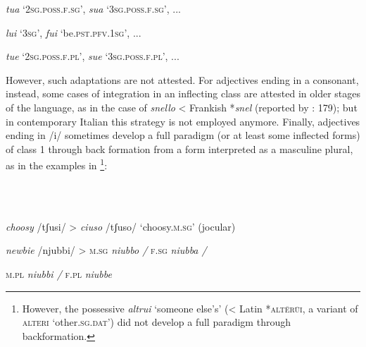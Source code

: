 \documentclass[output=paper]{langscibook}
\begin{document}
\textit{tua} ‘\textsc{2sg.poss.f.sg’}, \textit{sua} \textsc{‘3sg.poss.f.sg’,} ...

\textit{lui} \textsc{‘3sg’,} \textit{fui} \textsc{‘}be\textsc{.pst.pfv.1sg’,} ...

\textit{tue} ‘\textsc{2sg.poss.f.pl’}, \textit{sue} \textsc{‘3sg.poss.f.pl’,} ...

However, such adaptations are not attested. For adjectives ending in a consonant, instead, some cases of integration in an inflecting class are attested in older stages of the language, as in the case of \textit{snello} < Frankish *\textit{snel} (reported by \citealt{Repetti2012}: 179); but in contemporary Italian this strategy is not employed anymore. Finally, adjectives ending in /i/ sometimes develop a full paradigm (or at least some inflected forms) of class 1 through back formation from a form interpreted as a masculine plural, as in the examples in \footnote{However, the possessive \textit{altrui} ‘someone else’s’ (< Latin *\textsc{altĕrūi}, a variant of \textsc{alteri} ‘other.\textsc{sg.dat’}) did not develop a full paradigm through backformation.}:

\ea%
    \label{ex:key:18}
    \gll \\
         \\
    \glt
    \z %

          \textit{choosy} /tʃusi/  >   \textit{ciuso} /tʃuso/  ‘choosy.\textsc{m.sg’} (jocular)

  \textit{newbie} /njubbi/  >   \textsc{m.sg} \textit{niubbo /} \textsc{f.sg} \textit{niubba /} 

\textsc{m.pl} \textit{niubbi /} \textsc{f.pl} \textit{niubbe}
\end{document}
